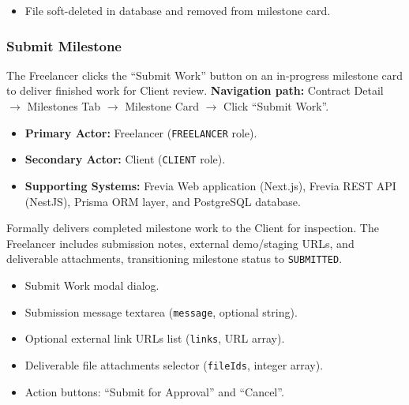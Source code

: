 \begin{itemize}[leftmargin=1.6em,topsep=3pt,itemsep=2pt,parsep=0pt,label=$\bullet$]
      \item File soft-deleted in database and removed from milestone card.
\end{itemize}

\subsubsection{ Submit Milestone}

The Freelancer clicks the ``Submit Work'' button on an in-progress milestone card to deliver finished work for Client review.\newline
\textbf{Navigation path:} Contract Detail $\rightarrow$ Milestones Tab $\rightarrow$ Milestone Card $\rightarrow$ Click ``Submit Work''.


\begin{itemize}[leftmargin=1.6em,topsep=3pt,itemsep=2pt,parsep=0pt,label=$\bullet$]
      \item \textbf{Primary Actor:} Freelancer (\texttt{FREELANCER} role).
      \item \textbf{Secondary Actor:} Client (\texttt{CLIENT} role).
      \item \textbf{Supporting Systems:} Frevia Web application (Next.js), Frevia REST API (NestJS), Prisma ORM layer, and PostgreSQL database.
\end{itemize}

\noindent Formally delivers completed milestone work to the Client for inspection. The Freelancer includes submission notes, external demo/staging URLs, and deliverable attachments, transitioning milestone status to \texttt{SUBMITTED}.

\begin{itemize}[leftmargin=1.6em,topsep=3pt,itemsep=2pt,parsep=0pt,label=$\bullet$]
      \item Submit Work modal dialog.
      \item Submission message textarea (\texttt{message}, optional string).
      \item Optional external link URLs list (\texttt{links}, URL array).
      \item Deliverable file attachments selector (\texttt{fileIds}, integer array).
      \item Action buttons: ``Submit for Approval'' and ``Cancel''.
\end{itemize}


